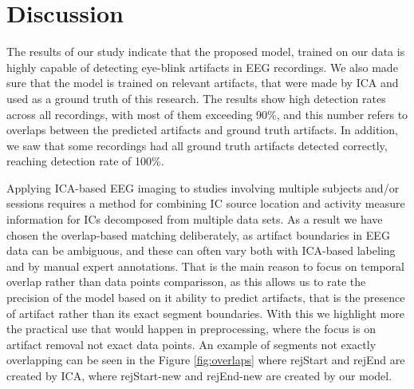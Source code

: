 \documentclass[12pt,a4paper,titlepage,openany]{report}
\begin{document}
\begin{table}[htbp]
\centering
{}
\caption{Artifact-level evaluation of model predictions with three residual blocks}
\label{tab:artifact_eval_3_blocks}
\end{table}

\section{Discussion}

The results of our study indicate that the proposed model, trained on our data is highly capable of detecting eye-blink artifacts in EEG recordings. We also made sure that the model is trained on relevant artifacts, that were made by ICA and used as a ground truth of this research. The results show high detection rates across all recordings, with most of them exceeding 90\%, and this number refers to overlaps between the predicted artifacts and ground truth artifacts. In addition, we saw that some recordings had all ground truth artifacts detected correctly, reaching detection rate of 100\%.

Applying ICA-based EEG imaging to studies involving multiple subjects and/or sessions requires a method for combining IC source location and activity measure information for ICs decomposed from multiple data sets.\cite{bigdely2013measure} As a result we have chosen the overlap-based matching deliberately, as artifact boundaries in EEG data can be ambiguous, and these can often vary both with ICA-based labeling and by manual expert annotations. That is the main reason to focus on temporal overlap rather than data points comparisson, as this allows us to rate the precision of the model based on it ability to predict artifacts, that is the presence of artifact rather than its exact segment boundaries. With this we highlight more the practical use that would happen in preprocessing, where the focus is on artifact removal not exact data points. An example of segments not exactly overlapping can be seen in the Figure \ref{fig:overlaps} where rejStart and rejEnd are created by ICA, where rejStart-new and rejEnd-new are created by our model.
\end{document}
